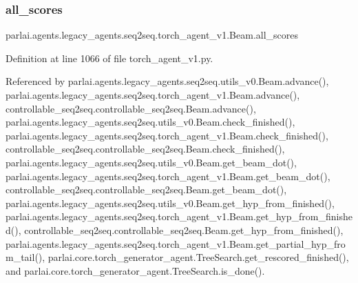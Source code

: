 \subsubsection{\texorpdfstring{all\+\_\+scores}{all\_scores}}
{\footnotesize\ttfamily parlai.\+agents.\+legacy\+\_\+agents.\+seq2seq.\+torch\+\_\+agent\+\_\+v1.\+Beam.\+all\+\_\+scores}



Definition at line 1066 of file torch\+\_\+agent\+\_\+v1.\+py.



Referenced by parlai.\+agents.\+legacy\+\_\+agents.\+seq2seq.\+utils\+\_\+v0.\+Beam.\+advance(), parlai.\+agents.\+legacy\+\_\+agents.\+seq2seq.\+torch\+\_\+agent\+\_\+v1.\+Beam.\+advance(), controllable\+\_\+seq2seq.\+controllable\+\_\+seq2seq.\+Beam.\+advance(), parlai.\+agents.\+legacy\+\_\+agents.\+seq2seq.\+utils\+\_\+v0.\+Beam.\+check\+\_\+finished(), parlai.\+agents.\+legacy\+\_\+agents.\+seq2seq.\+torch\+\_\+agent\+\_\+v1.\+Beam.\+check\+\_\+finished(), controllable\+\_\+seq2seq.\+controllable\+\_\+seq2seq.\+Beam.\+check\+\_\+finished(), parlai.\+agents.\+legacy\+\_\+agents.\+seq2seq.\+utils\+\_\+v0.\+Beam.\+get\+\_\+beam\+\_\+dot(), parlai.\+agents.\+legacy\+\_\+agents.\+seq2seq.\+torch\+\_\+agent\+\_\+v1.\+Beam.\+get\+\_\+beam\+\_\+dot(), controllable\+\_\+seq2seq.\+controllable\+\_\+seq2seq.\+Beam.\+get\+\_\+beam\+\_\+dot(), parlai.\+agents.\+legacy\+\_\+agents.\+seq2seq.\+utils\+\_\+v0.\+Beam.\+get\+\_\+hyp\+\_\+from\+\_\+finished(), parlai.\+agents.\+legacy\+\_\+agents.\+seq2seq.\+torch\+\_\+agent\+\_\+v1.\+Beam.\+get\+\_\+hyp\+\_\+from\+\_\+finished(), controllable\+\_\+seq2seq.\+controllable\+\_\+seq2seq.\+Beam.\+get\+\_\+hyp\+\_\+from\+\_\+finished(), parlai.\+agents.\+legacy\+\_\+agents.\+seq2seq.\+torch\+\_\+agent\+\_\+v1.\+Beam.\+get\+\_\+partial\+\_\+hyp\+\_\+from\+\_\+tail(), parlai.\+core.\+torch\+\_\+generator\+\_\+agent.\+Tree\+Search.\+get\+\_\+rescored\+\_\+finished(), and parlai.\+core.\+torch\+\_\+generator\+\_\+agent.\+Tree\+Search.\+is\+\_\+done().

\mbox{\label{classparlai_1_1agents_1_1legacy__agents_1_1seq2seq_1_1torch__agent__v1_1_1Beam_a3e3407eeb8dd25ede9950524146f9403}} 
